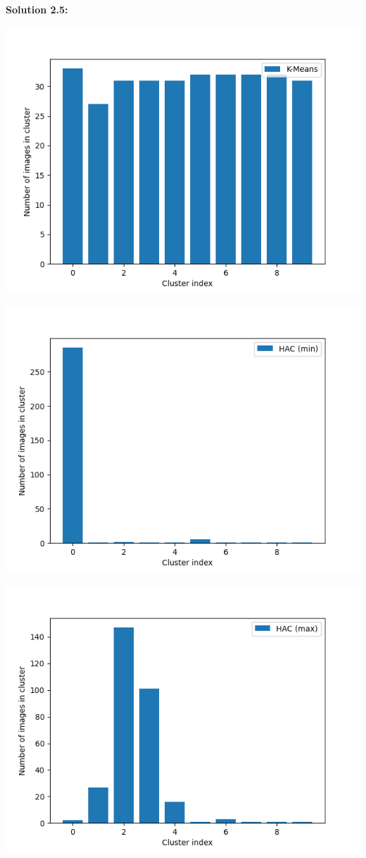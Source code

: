 \documentclass[submit]{harvardml}
\begin{document}
\noindent\textbf{Solution 2.5:}\\
\begin{center}
    \includegraphics[scale=0.6]{HW4/2.5_kmeans.png}
\end{center}
\begin{center}
    \includegraphics[scale=0.6]{HW4/2.5_hacmin.png}
\end{center}
\begin{center}
    \includegraphics[scale=0.6]{HW4/2.5_hacmax.png}
\end{center}
\end{document}
